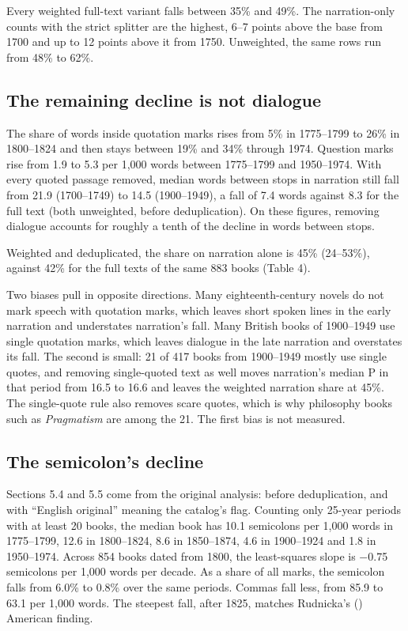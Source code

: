 \documentclass[
  11pt,
]{article}
\begin{document}
Every weighted full-text variant falls between 35\% and 49\%. The narration-only counts with the strict splitter are the highest, 6--7 points above the base from 1700 and up to 12 points above it from
1750. Unweighted, the same rows run from 48\% to 62\%.

\subsection{The remaining decline is not dialogue}\label{the-remaining-decline-is-not-dialogue}

The share of words inside quotation marks rises from 5\% in 1775--1799 to 26\% in 1800--1824 and then stays between 19\% and 34\% through 1974. Question marks rise from 1.9 to 5.3 per 1,000 words
between 1775--1799 and 1950--1974. With every quoted passage removed, median words between stops in narration still fall from 21.9 (1700--1749) to 14.5 (1900--1949), a fall of 7.4 words against 8.3
for the full text (both unweighted, before deduplication). On these figures, removing dialogue accounts for roughly a tenth of the decline in words between stops.

Weighted and deduplicated, the share on narration alone is 45\% (24--53\%), against 42\% for the full texts of the same 883 books (Table 4).

Two biases pull in opposite directions. Many eighteenth-century novels do not mark speech with quotation marks, which leaves short spoken lines in the early narration and understates narration's fall.
Many British books of 1900--1949 use single quotation marks, which leaves dialogue in the late narration and overstates its fall. The second is small: 21 of 417 books from 1900--1949 mostly use single
quotes, and removing single-quoted text as well moves narration's median P in that period from 16.5 to 16.6 and leaves the weighted narration share at 45\%. The single-quote rule also removes scare
quotes, which is why philosophy books such as \emph{Pragmatism} are among the 21. The first bias is not measured.

\subsection{The semicolon's decline}\label{the-semicolons-decline}

Sections 5.4 and 5.5 come from the original analysis: before deduplication, and with ``English original'' meaning the catalog's flag. Counting only 25-year periods with at least 20 books, the median
book has 10.1 semicolons per 1,000 words in 1775--1799, 12.6 in 1800--1824, 8.6 in 1850--1874, 4.6 in 1900--1924 and 1.8 in 1950--1974. Across 854 books dated from 1800, the least-squares slope is
−0.75 semicolons per 1,000 words per decade. As a share of all marks, the semicolon falls from 6.0\% to 0.8\% over the same periods. Commas fall less, from 85.9 to 63.1 per 1,000 words. The steepest
fall, after 1825, matches Rudnicka's () American finding.
\end{document}
